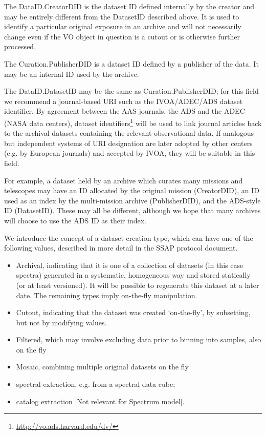 \documentclass[11pt]{article}
\begin{document}
The DataID.CreatorDID is the dataset ID defined internally by
the creator and may be entirely different from the DatasetID described
above. It is used to identify a particular original exposure in an archive
and will not necessarily change even if the VO object in question is a cutout or
is otherwise further processed.

The Curation.PublisherDID is a dataset ID defined by a publisher
of the data. It may be an internal ID used by the archive.

The DataID.DatasetID may be the same as Curation.PublisherDID;
for this field we recommend a journal-based URI such
as the IVOA/ADEC/ADS dataset identifier.
By agreement between the AAS journals, the ADS and the ADEC (NASA data centers),
dataset identifiers\footnote{\url{http://vo.ads.harvard.edu/dv/}}
will be used to link journal articles back
to the archival datasets containing the relevant observational data.
If analogous but independent systems of URI designation are later
adopted by other centers (e.g. by European journals) and accepted by IVOA,
they will be suitable in this field.

For example, a dataset held by an archive which curates many
missions and telescopes may have an ID allocated by the original
mission (CreatorDID), an ID used as an index by the multi-mission archive (PublisherDID),
and the ADS-style ID (DatasetID). These may all be different, although
we hope that many archives will choose to use the ADS ID as their index.

We introduce the concept of a dataset creation type, which
can have one of the following  values, described in more
detail in the SSAP protocol document.

\begin{itemize}

\item Archival, indicating that it is one of a collection of
datasets (in this case spectra) generated in a systematic, homogeneous
way and stored statically (or at least versioned). It will be possible
to regenerate this dataset at a later date. The remaining types
imply on-the-fly manipulation.

\item Cutout, indicating that the dataset was created `on-the-fly',
by subsetting, but not by modifying values.

\item Filtered,  which may involve excluding data prior
to binning into samples, also on the fly

\item Mosaic, combining multiple original datasets on the fly

\item spectral extraction, e.g. from a spectral data cube;

\item catalog extraction [Not relevant for Spectrum model].

\end{itemize}
\end{document}
